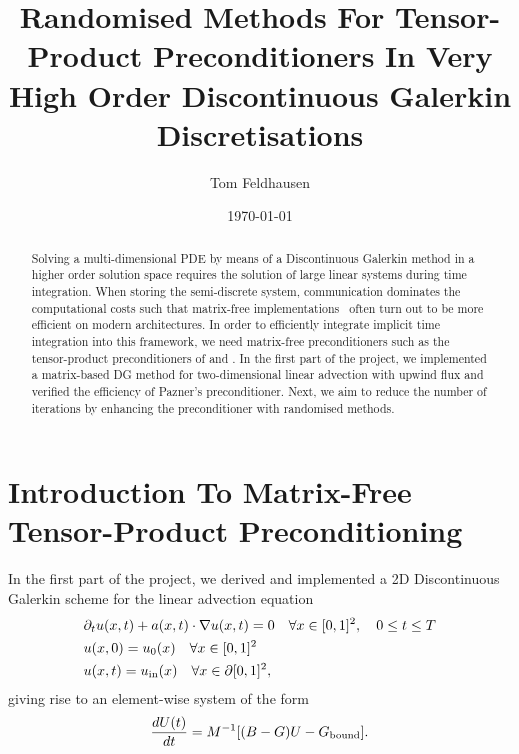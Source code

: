 \documentclass[12pt]{report}
\theoremstyle{remark}
\begin{document}
\title{Randomised Methods For Tensor-Product Preconditioners In Very High Order Discontinuous Galerkin Discretisations}
\author{Tom Feldhausen}
\date{\today}

\maketitle

\begin{abstract}
Solving a multi-dimensional PDE by means of a Discontinuous Galerkin method in a higher order solution space requires the solution of large linear systems during time integration. When storing the semi-discrete system, communication dominates the computational costs such that matrix-free implementations~\cite{kronbichler2019fast} often turn out to be more efficient on modern architectures. In order to efficiently integrate implicit time integration into this framework, we need matrix-free preconditioners such as the tensor-product preconditioners of \cite{diosady2017tensor} and \cite{pazner2018approximate}. In the first part of the project, we implemented a matrix-based DG method for two-dimensional linear advection with upwind flux and verified the efficiency of Pazner's preconditioner. Next, we aim to reduce the number of iterations by enhancing the preconditioner with randomised methods.
\end{abstract}

\section*{Introduction To Matrix-Free Tensor-Product Preconditioning}
In the first part of the project, we derived and implemented a 2D Discontinuous Galerkin scheme for the linear advection equation
\begin{equation}
\label{eq:advection}
\begin{aligned}
&\partial_t u(x, t) + a(x,t) \cdot \nabla u(x,t) = 0 \quad \forall x \in [0,1]^2, \quad 0 \leq t \leq T
\\
&u(x, 0) = u_0(x) \quad \forall x \in [0,1]^2
\\
&u(x, t) = u_{\textnormal{in}}(x) \quad \forall x \in \partial [0, 1]^2,
\end{aligned}
\end{equation}
giving rise to an element-wise system of the form
\begin{align}
\frac{dU(t)}{dt} = M^{-1} [(B - G) U - G_{\textnormal{bound}}].
\end{align}
\end{document}
